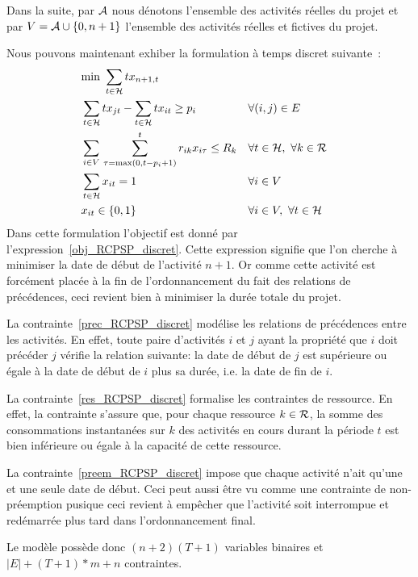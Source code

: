 Dans la suite, par ${\cal A}$ nous dénotons l'ensemble des
activités réelles du projet et par $V={\cal A} \cup \{0,n+1\}$
l'ensemble des activités réelles et fictives du projet.

Nous pouvons maintenant exhiber la formulation à temps discret
suivante~\cite{ex_RCPSP_discret}:
{\small \begin{align} &\text{min }
\sum_{t \in {\cal H}} tx_{n+1,t} \label{obj_RCPSP_discret}\\
&\sum_{t \in {\cal H}} tx_{jt} - \sum_{t \in {\cal H}} tx_{it} \ge p_i &
&\forall (i,j) \in E \label{prec_RCPSP_discret}\\ &\sum_{i \in
V}\,\sum_{\tau=\max(0,t-p_i+1)}^t r_{ik}x_{i\tau} \le R_k& &\forall t\in
{\cal H},\ \forall k \in {\cal R} \label{res_RCPSP_discret}\\
&\sum_{t\in {\cal H}} x_{it}=1& & \forall i \in V
\label{preem_RCPSP_discret}\\ & x_{it} \in \{0,1\} & &\forall i
\in V,\ \forall t \in {\cal H} \end{align}
 } 
Dans cette formulation l'objectif est donné par
l'expression~\eqref{obj_RCPSP_discret}. Cette expression signifie que
l'on cherche à minimiser la date de début de l'activité $n+1$. Or
comme cette activité est forcément placée à la fin de
l'ordonnancement du fait des relations de précédences, ceci
revient bien à minimiser la durée totale du projet.

La contrainte~\eqref{prec_RCPSP_discret} modélise les relations de
précédences entre les activités. En effet, toute paire d'activités
$i$ et $j$ ayant la propriété que $i$ doit précéder $j$ vérifie la
relation suivante: la date de début de $j$ est supérieure ou égale
à la date de début de $i$ plus sa durée, i.e. la date de fin de
$i$.

La contrainte~\eqref{res_RCPSP_discret} formalise les contraintes de
ressource. En effet, la contrainte s'assure que, pour chaque ressource
$k \in {\cal R}$, la somme des consommations instantanées sur $k$ des
activités en cours durant la période $t$ est bien inférieure ou égale à la
capacité de cette ressource.

La contrainte~\eqref{preem_RCPSP_discret} impose que chaque activité
n'ait qu'une et une seule date de début. Ceci peut aussi être vu comme
une contrainte de non-préemption pusique ceci revient à empêcher que
l'activité soit interrompue et redémarrée plus tard dans
l'ordonnancement final.

Le modèle possède donc $(n+2)(T+1)$ variables binaires et
$|E|+(T+1)*m+n$ contraintes.

